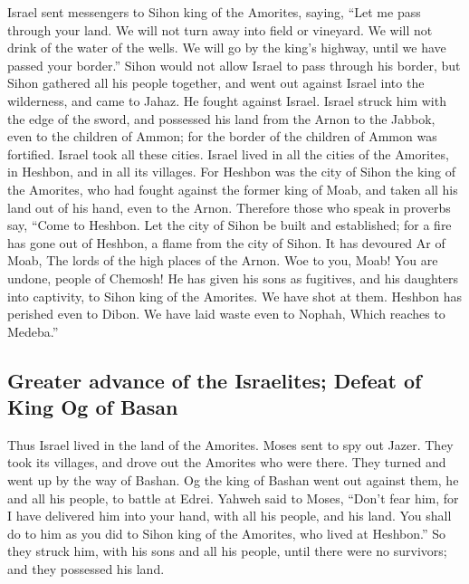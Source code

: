 Israel sent messengers to Sihon king of the Amorites,
saying,  ``Let me pass through your land. We will not
turn away into field or vineyard. We will not drink of the water of the
wells. We will go by the king's highway, until we have passed your
border.''  Sihon would not allow Israel to pass through
his border, but Sihon gathered all his people together, and went out
against Israel into the wilderness, and came to Jahaz. He fought against
Israel.  Israel struck him with the edge of the sword,
and possessed his land from the Arnon to the Jabbok, even to the
children of Ammon; for the border of the children of Ammon was
fortified.  Israel took all these cities. Israel lived in
all the cities of the Amorites, in Heshbon, and in all its villages.
 For Heshbon was the city of Sihon the king of the
Amorites, who had fought against the former king of Moab, and taken all
his land out of his hand, even to the Arnon.  Therefore
those who speak in proverbs say, ``Come to Heshbon. Let the city of
Sihon be built and established;  for a fire has gone out
of Heshbon, a flame from the city of Sihon. It has devoured Ar of Moab,
The lords of the high places of the Arnon.  Woe to you,
Moab! You are undone, people of Chemosh! He has given his sons as
fugitives, and his daughters into captivity, to Sihon king of the
Amorites.  We have shot at them. Heshbon has perished
even to Dibon. We have laid waste even to Nophah, Which reaches to
Medeba.''

\hypertarget{greater-advance-of-the-israelites-defeat-of-king-og-of-basan}{%
\subsection{Greater advance of the Israelites; Defeat of King Og of
Basan}\label{greater-advance-of-the-israelites-defeat-of-king-og-of-basan}}

 Thus Israel lived in the land of the Amorites.
 Moses sent to spy out Jazer. They took its villages, and
drove out the Amorites who were there.  They turned and
went up by the way of Bashan. Og the king of Bashan went out against
them, he and all his people, to battle at Edrei.  Yahweh
said to Moses, ``Don't fear him, for I have delivered him into your
hand, with all his people, and his land. You shall do to him as you did
to Sihon king of the Amorites, who lived at Heshbon.'' 
So they struck him, with his sons and all his people, until there were
no survivors; and they possessed his land.

